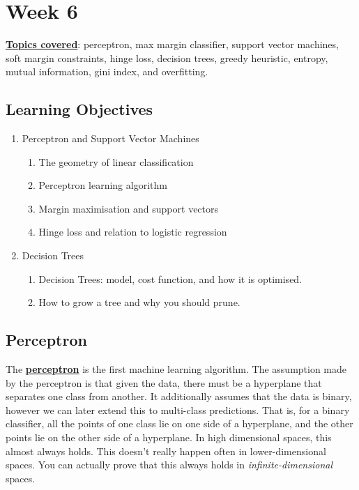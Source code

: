 \documentclass[11pt]{scrartcl}
\theoremstyle{definition}
\theoremstyle{remark}
\newcommand{\dfn}[1]{\textbf{\underline{#1}}}
\begin{document}
\section{Week 6}
\dfn{Topics covered}: perceptron, max margin classifier, support vector machines, soft margin constraints, hinge loss, decision trees, greedy heuristic, entropy, mutual information, gini index, and overfitting. 

\subsection{Learning Objectives}
\begin{enumerate}[noitemsep]
	\item Perceptron and Support Vector Machines 
	\begin{enumerate}[noitemsep]
		\item The geometry of linear classification
		\item Perceptron learning algorithm
		\item Margin maximisation and support vectors 
		\item Hinge loss and relation to logistic regression 
	\end{enumerate}
	\item Decision Trees
	\begin{enumerate}[noitemsep]
		\item Decision Trees: model, cost function, and how it is optimised. 
		\item How to grow a tree and why you should prune. 
	\end{enumerate}
\end{enumerate}

\subsection{Perceptron}
The \dfn{perceptron} is the first machine learning algorithm. The assumption made by the perceptron is that given the data, there must be a hyperplane that separates one class from another. It additionally assumes that the data is binary, however we can later extend this to multi-class predictions. That is, for a binary classifier, all the points of one class lie on one side of a hyperplane, and the other points lie on the other side of a hyperplane. In high dimensional spaces, this almost always holds. This doesn't really happen often in lower-dimensional spaces. You can actually prove that this always holds in \emph{infinite-dimensional} spaces. 
\end{document}
